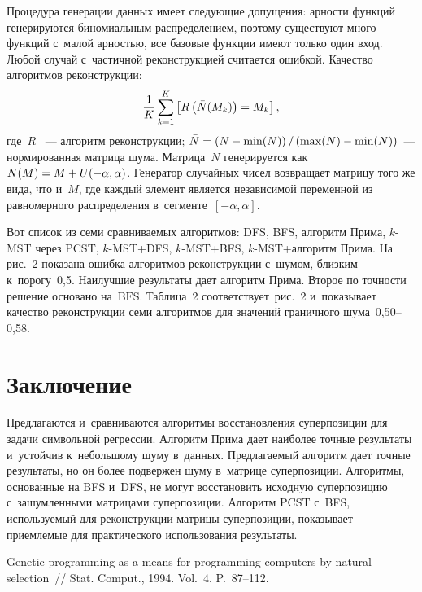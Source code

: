 \begin{multicols}{2}
Процедура генерации данных имеет следующие допущения: арности функций 
генерируются биномиальным распределением, поэтому существуют много функций 
с~малой арностью, все базовые функции имеют только один вход. Любой случай 
с~частичной реконструкцией считается ошибкой. Качество алгоритмов реконструкции:
$$
\displaystyle\frac{\displaystyle 1\mathstrut}{\displaystyle K\mathstrut}\sum\limits_{k=1}^K \left[ R\left( \bar{N}(M_k)\right)=M_k\right],
$$
где~$R$ ~--- алгоритм реконструкции;
$\bar{N}\hm=\left(N - \min(N)\right)/\left(\max(N)\hm-\min(N)\right)$~--- нормированная мат\-ри\-ца шума. 
Мат\-ри\-ца~$N$ генерируется как~$N(M)\hm=M\hm+U(-\alpha,\alpha)$.
Генератор случайных чисел возвращает матрицу того же вида, что и~$M$, где каждый 
элемент является независимой переменной из равномерного распределения 
в~сегменте~$[-\alpha,\alpha]$.

Вот список из семи сравниваемых алгоритмов:
DFS,
BFS,
алгоритм Прима,
$k$-MST через PCST,
$k$-MST\;+\;DFS,
$k$-MST\;+\;BFS,
$k$-MST\;+\;ал\-го\-ритм Прима.
На рис.~2 показана ошибка алгоритмов реконструкции 
с~шумом, близ\-ким к~порогу~0,5. Наилучшие результаты дает алгоритм Прима. Второе по 
точности решение основано на~$\text{BFS}$. Таб\-ли\-ца~2 
соответствует~рис.~2 и~показывает качество реконструкции 
семи алгоритмов для значений граничного шума~0,50--0,58.





\vspace*{-9pt}

\section{Заключение}

\vspace*{-3pt}

Предлагаются и~сравниваются  алгоритмы вос\-ста\-нов\-ле\-ния суперпозиции для задачи 
символьной регрессии. Алгоритм Прима дает наиболее точ\-ные результаты и~устойчив 
к~небольшому шуму в~данных. Пред\-ла\-га\-емый алгоритм дает точные результаты, но он 
более подвержен шуму в~мат\-ри\-це суперпозиции. Алгоритмы, основанные на BFS и~DFS, 
не могут вос\-ста\-но\-вить исходную суперпозицию с~зашумленными мат\-ри\-ца\-ми 
суперпозиции. Алгоритм PCST с~BFS, используемый для реконструкции мат\-ри\-цы 
суперпозиции, показывает приемлемые для практического использования результаты.

{\small\frenchspacing
 {%
 \begin{thebibliography}{99}
 Genetic programming as a means for programming computers by 
natural selection~// Stat. Comput., 1994. Vol.~4. P.~87--112.


\end{thebibliography}}}
\end{multicols}
